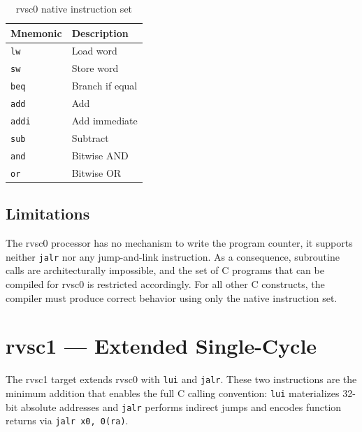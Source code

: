 \begin{table}[htb]
\centering
\caption{rvsc0 native instruction set}
\label{tab:rvsc0-isa}
\begin{tabular}{ll}
\toprule
\textbf{Mnemonic} & \textbf{Description} \\
\midrule
\texttt{lw}   & Load word \\
\texttt{sw}   & Store word \\
\texttt{beq}  & Branch if equal \\
\texttt{add}  & Add \\
\texttt{addi} & Add immediate \\
\texttt{sub}  & Subtract \\
\texttt{and}  & Bitwise AND \\
\texttt{or}   & Bitwise OR \\
\bottomrule
\end{tabular}
\end{table}

\subsection{Limitations}

The rvsc0 processor has no mechanism to write the program counter, it supports neither \texttt{jalr}
nor any jump-and-link instruction. As a consequence, subroutine calls are architecturally impossible,
and the set of C programs that can be compiled for rvsc0 is restricted accordingly. For all other C
constructs, the compiler must produce correct behavior using only the native instruction set.

\section{rvsc1 --- Extended Single-Cycle}

The rvsc1 target extends rvsc0 with \texttt{lui} and \texttt{jalr}. These two instructions are the
minimum addition that enables the full C calling convention: \texttt{lui} materializes 32-bit absolute
addresses and \texttt{jalr} performs indirect jumps and encodes function returns via
\texttt{jalr x0, 0(ra)}.

